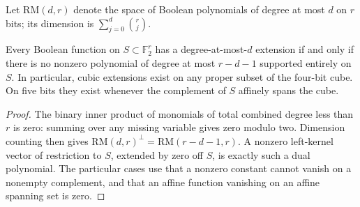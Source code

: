 Let $\mathrm{RM}(d,r)$ denote the space of Boolean polynomials of degree
at most $d$ on $r$ bits; its dimension is $\sum_{j=0}^d\binom rj$.
\begin{lemma}
\label{lem:nonlinear-extension}
Every Boolean function on $S\subset\mathbb F_2^r$ has a degree-at-most-$d$
extension if and only if there is no nonzero polynomial of degree at
most $r-d-1$ supported entirely on $S$. In particular, cubic extensions
exist on any proper subset of the four-bit cube. On five bits they
exist whenever the complement of $S$ affinely spans the cube.
\end{lemma}
\begin{proof}
The binary inner product of monomials of total combined degree less
than $r$ is zero: summing over any missing variable gives zero modulo
two. Dimension counting then gives
$\mathrm{RM}(d,r)^\perp=\mathrm{RM}(r-d-1,r)$.
A nonzero left-kernel vector of restriction to $S$, extended by zero
off $S$, is exactly such a dual polynomial. The particular cases use
that a nonzero constant cannot vanish on a nonempty complement, and
that an affine function vanishing on an affine spanning set is zero.
\end{proof}


